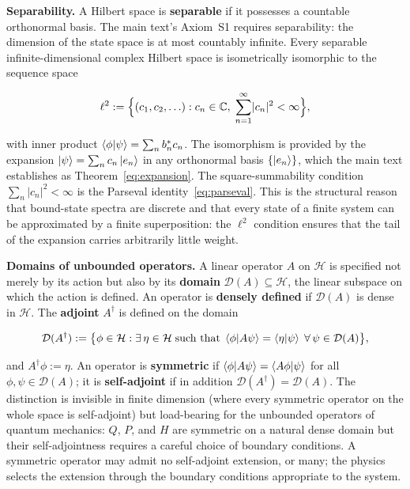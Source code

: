 \medskip\noindent\textbf{Separability.} A Hilbert space is \textbf{separable} if it possesses a countable orthonormal basis. The main text's Axiom~S1 requires separability: the dimension of the state space is at most countably infinite. Every separable infinite-dimensional complex Hilbert space is isometrically isomorphic to the sequence space
\begin{linenomath}
    \begin{equation}
        \ell^2 := \Bigl\{ (c_1, c_2, \ldots) : c_n \in \mathbb{C},\; \sum_{n=1}^\infty \lvert c_n\rvert^2 < \infty \Bigr\},
        \label{eq:ell2-def}
    \end{equation}
\end{linenomath}
with inner product $\braket{\phi|\psi} = \sum_n b_n^* c_n$. The isomorphism is provided by the expansion $\ket{\psi} = \sum_n c_n \ket{e_n}$ in any orthonormal basis $\{\ket{e_n}\}$, which the main text establishes as Theorem~\eqref{eq:expansion}. The square-summability condition $\sum_n \lvert c_n\rvert^2 < \infty$ is the Parseval identity~\eqref{eq:parseval}. This is the structural reason that bound-state spectra are discrete and that every state of a finite system can be approximated by a finite superposition: the $\ell^2$ condition ensures that the tail of the expansion carries arbitrarily little weight.

\medskip\noindent\textbf{Domains of unbounded operators.} A linear operator $A$ on $\mathcal{H}$ is specified not merely by its action but also by its \textbf{domain} $\mathcal{D}(A) \subseteq \mathcal{H}$, the linear subspace on which the action is defined. An operator is \textbf{densely defined} if $\mathcal{D}(A)$ is dense in $\mathcal{H}$. The \textbf{adjoint} $A^\dagger$ is defined on the domain
\begin{linenomath}
    \begin{equation}
        \mathcal{D}(A^\dagger) := \bigl\{ \phi \in \mathcal{H} : \exists\,\eta \in \mathcal{H}\; \text{such that}\; \braket{\phi|A\psi} = \braket{\eta|\psi}\; \forall\,\psi \in \mathcal{D}(A) \bigr\},
        \label{eq:adjoint-domain}
    \end{equation}
\end{linenomath}
and $A^\dagger \phi := \eta$. An operator is \textbf{symmetric} if $\braket{\phi|A\psi} = \braket{A\phi|\psi}$ for all $\phi,\psi \in \mathcal{D}(A)$; it is \textbf{self-adjoint} if in addition $\mathcal{D}(A^\dagger) = \mathcal{D}(A)$. The distinction is invisible in finite dimension (where every symmetric operator on the whole space is self-adjoint) but load-bearing for the unbounded operators of quantum mechanics: $Q$, $P$, and $H$ are symmetric on a natural dense domain but their self-adjointness requires a careful choice of boundary conditions. A symmetric operator may admit no self-adjoint extension, or many; the physics selects the extension through the boundary conditions appropriate to the system.

